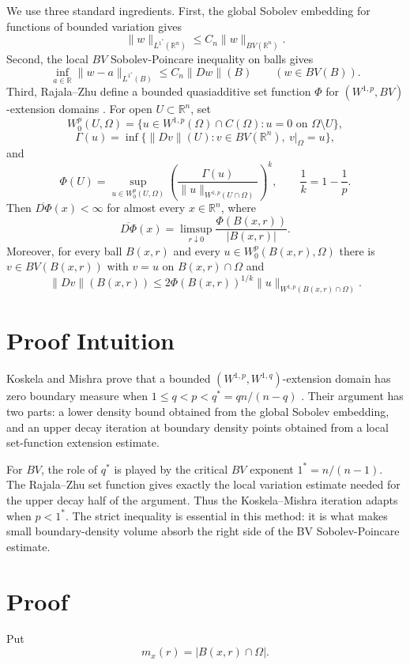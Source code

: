 \documentclass[11pt]{article}
\newcommand{\R}{\mathbb{R}}
\newcommand{\Om}{\Omega}
\newcommand{\onecrit}{1^\ast}
\begin{document}
We use three standard ingredients. First, the global Sobolev embedding for
functions of bounded variation gives
\[
  \|w\|_{L^{\onecrit}(\R^n)}\le C_n\|w\|_{BV(\R^n)}.
\]
Second, the local \(BV\) Sobolev-Poincare inequality on balls gives
\[
  \inf_{a\in\R}\|w-a\|_{L^{\onecrit}(B)}
       \le C_n\|Dw\|(B)
       \qquad (w\in BV(B)).
\]
Third, Rajala--Zhu define a bounded quasiadditive set function \(\Phi\) for
\((W^{1,p},BV)\)-extension domains \cite[Lemmas 3.2--3.4]{RZ}. For open
\(U\subset\R^n\), set
\[
  W^p_0(U,\Om)
   =\{u\in W^{1,p}(\Om)\cap C(\Om):u=0\text{ on }\Om\setminus U\},
\]
\[
  \Gamma(u)=\inf\{\|Dv\|(U): v\in BV(\R^n),\ v|_\Om=u\},
\]
and
\[
  \Phi(U)
    =\sup_{u\in W^p_0(U,\Om)}
       \left(\frac{\Gamma(u)}
       {\|u\|_{W^{1,p}(U\cap\Om)}}\right)^k,
  \qquad \frac1k=1-\frac1p .
\]
Then \(\overline{D\Phi}(x)<\infty\) for almost every \(x\in\R^n\), where
\[
  \overline{D\Phi}(x)
     =\limsup_{r\downarrow0}\frac{\Phi(B(x,r))}{|B(x,r)|}.
\]
Moreover, for every ball \(B(x,r)\) and every \(u\in W^p_0(B(x,r),\Om)\) there
is \(v\in BV(B(x,r))\) with \(v=u\) on \(B(x,r)\cap\Om\) and
\[
  \|Dv\|(B(x,r))
       \le 2\Phi(B(x,r))^{1/k}
             \|u\|_{W^{1,p}(B(x,r)\cap\Om)}.
\]

\section*{Proof Intuition}

Koskela and Mishra prove that a bounded \((W^{1,p},W^{1,q})\)-extension domain
has zero boundary measure when \(1\le q<p<q^\ast=qn/(n-q)\) \cite{KM}. Their
argument has two parts: a lower density bound obtained from the global Sobolev
embedding, and an upper decay iteration at boundary density points obtained
from a local set-function extension estimate.

For \(BV\), the role of \(q^\ast\) is played by the critical \(BV\) exponent
\(\onecrit=n/(n-1)\). The Rajala--Zhu set function gives exactly the local
variation estimate needed for the upper decay half of the argument. Thus the
Koskela--Mishra iteration adapts when \(p<\onecrit\). The strict inequality is
essential in this method: it is what makes small boundary-density volume
absorb the right side of the BV Sobolev-Poincare estimate.

\section*{Proof}

Put
\[
  m_x(r)=|B(x,r)\cap\Om|.
\]
\end{document}
